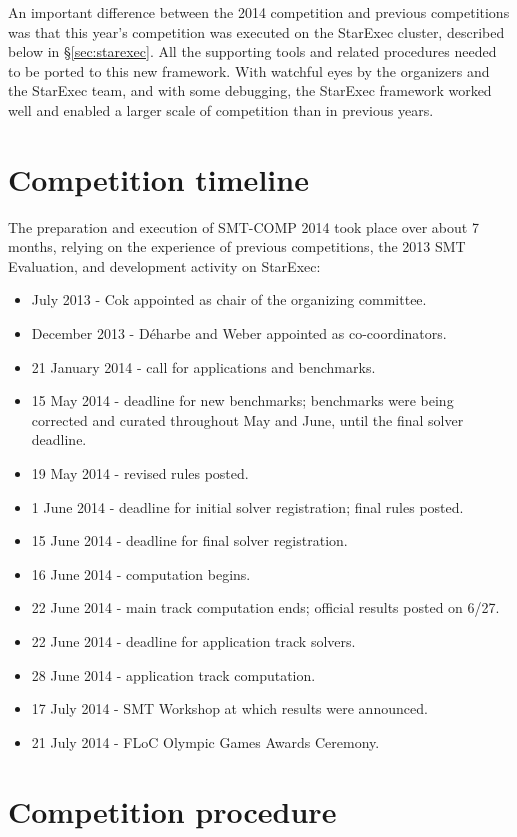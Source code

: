 \documentclass[twoside,11pt]{article}
\begin{document}
An important difference between the 2014 competition and previous competitions was that this year's competition was executed on the StarExec cluster, described below in \S\ref{sec:starexec}. All the supporting tools and related procedures needed to be ported to this new framework. With watchful eyes by the organizers and the StarExec team, and with some debugging, the StarExec framework worked well and enabled a larger scale of competition than in previous years.

\section{Competition timeline}
\label{sec:timeline}

The preparation and execution of SMT-COMP 2014 took place over about 7 months, relying on the experience of previous competitions, the 2013 SMT Evaluation, and development activity on StarExec:
\begin{itemize}
\item July 2013 - Cok appointed as chair of the organizing committee.
\item December 2013 - D\'{e}harbe and Weber appointed as co-coordinators.
\item 21 January 2014 - call for applications and benchmarks.
\item 15 May 2014 - deadline for new benchmarks; benchmarks were being corrected and curated throughout May and June, until the final solver deadline.
\item 19 May 2014 - revised rules posted.
\item 1 June 2014 - deadline for initial solver registration; final rules posted.
\item 15 June 2014 - deadline for final solver registration.
\item 16 June 2014 - computation begins.
\item 22 June 2014 - main track computation ends; official results posted on 6/27. 
\item 22 June 2014 - deadline for application track solvers.
\item 28 June 2014 - application track computation.
\item 17 July 2014 - SMT Workshop at which results were announced.
\item 21 July 2014 - FLoC Olympic Games Awards Ceremony.
\end{itemize}

\section{Competition procedure} 
\label{sec:procedure}
\end{document}
